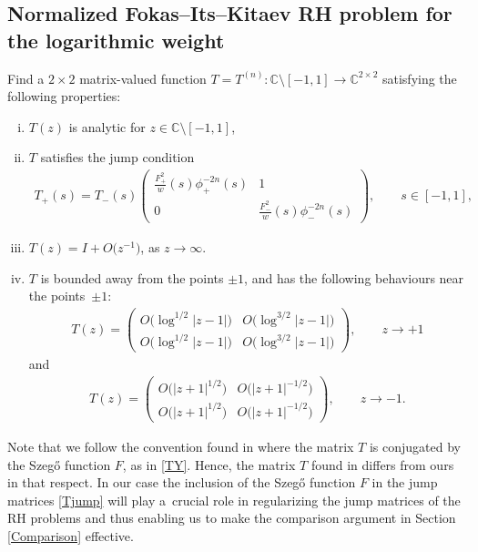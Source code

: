 \documentclass[11pt]{article}
\numberwithin{equation}{section}
\newcommand{\C}{\mathbb{C}}
\newcommand{\Id}{I}
\numberwithin{equation}{section}
\begin{document}
\subsection{Normalized Fokas--Its--Kitaev RH problem for the logarithmic weight}
Find a $2\times2$ matrix-valued function $T = T^{(n)} \colon \C \setminus [-1,1] \to \C^{2\times2}$ satisfying the following properties:
\begin{enumerate}[(i)]\itemsep=0pt
 \item $T(z)$ is analytic for $z \in \C \setminus [-1,1]$,
 \item $T$ satisfies the jump condition
 \begin{align}\label{Tjump}
 T_+(s) = T_-(s) \begin{pmatrix}
 \frac{F_+^2}{w}(s)\phi_+^{-2n}(s) & 1
 \\
 0 & \frac{F_-^2}{w}(s)\phi_-^{-2n}(s)
 \end{pmatrix}, \qquad s\in [-1,1],
 \end{align}
\item $T(z) = \Id + O\big(z^{-1}\big)$, as $z \rightarrow \infty$.
\item $T$ is bounded away from the points $\pm 1$, and has the following behaviours near the points~$\pm1$:
\begin{align*}
 T(z) = \begin{pmatrix}
 O\big(\log^{1/2}|z-1|\big) & O\big(\log^{3/2}|z-1|\big)
 \\
 O\big(\log^{1/2}|z-1|\big) & O\big(\log^{3/2}|z-1|\big)
 \end{pmatrix}, \qquad z\to +1
\end{align*}
and
\begin{align}\label{Tjump-1}
 T(z) = \begin{pmatrix}
 O\big(|z+1|^{1/2}\big) & O\big(|z+1|^{-1/2}\big)
 \\
 O\big(|z+1|^{1/2}\big) & O\big(|z+1|^{-1/2}\big)
 \end{pmatrix}, \qquad z \to -1.
\end{align}
\end{enumerate}
Note that we follow the convention found in \cite{CD} where the matrix $T$ is conjugated by the Szeg\H{o} function $F$, as in \eqref{TY}. Hence, the matrix $T$ found in \cite[equation~(3.1)]{KMVV} differs from ours in that respect. In our case the inclusion of the Szeg\H{o} function $F$ in the jump matrices \eqref{Tjump} will play a~crucial role in regularizing the jump matrices of the RH problems and thus enabling us to make the comparison argument in Section \ref{Comparison} effective.
\end{document}
